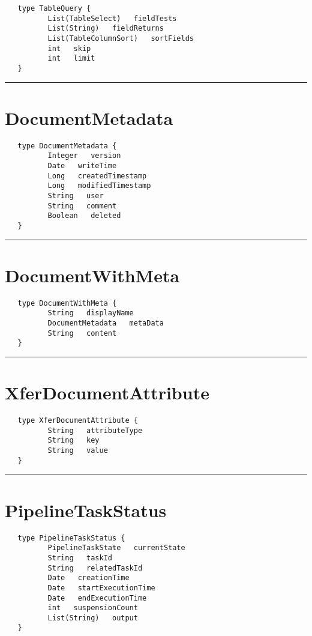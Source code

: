 \begin{verbatim}
   type TableQuery {
          List(TableSelect)   fieldTests
          List(String)   fieldReturns
          List(TableColumnSort)   sortFields
          int   skip
          int   limit
   }
\end{verbatim}

\rule{15cm}{2pt}
\section{DocumentMetadata}
\label{type:DocumentMetadata}

\begin{verbatim}
   type DocumentMetadata {
          Integer   version
          Date   writeTime
          Long   createdTimestamp
          Long   modifiedTimestamp
          String   user
          String   comment
          Boolean   deleted
   }
\end{verbatim}

\rule{15cm}{2pt}
\section{DocumentWithMeta}
\label{type:DocumentWithMeta}

\begin{verbatim}
   type DocumentWithMeta {
          String   displayName
          DocumentMetadata   metaData
          String   content
   }
\end{verbatim}

\rule{15cm}{2pt}
\section{XferDocumentAttribute}
\label{type:XferDocumentAttribute}

\begin{verbatim}
   type XferDocumentAttribute {
          String   attributeType
          String   key
          String   value
   }
\end{verbatim}

\rule{15cm}{2pt}
\section{PipelineTaskStatus}
\label{type:PipelineTaskStatus}

\begin{verbatim}
   type PipelineTaskStatus {
          PipelineTaskState   currentState
          String   taskId
          String   relatedTaskId
          Date   creationTime
          Date   startExecutionTime
          Date   endExecutionTime
          int   suspensionCount
          List(String)   output
   }
\end{verbatim}

